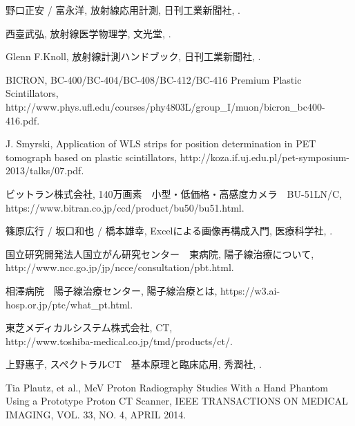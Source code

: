 \begin{bib}[100]
     野口正安 / 富永洋,
     \newblock 放射線応用計測,
     \newblock 日刊工業新聞社,
     .
     
     西臺武弘,
     \newblock 放射線医学物理学,
     \newblock 文光堂,
     .
     
     Glenn F.Knoll,
     \newblock 放射線計測ハンドブック,
     \newblock 日刊工業新聞社,
     .
     
     BICRON,
     \newblock BC-400/BC-404/BC-408/BC-412/BC-416 Premium Plastic Scintillators,
     \newblock http://www.phys.ufl.edu/courses/phy4803L/group\_I/muon/bicron\_bc400-416.pdf.
     
     J. Smyrski,
     \newblock Application of WLS strips for position determination in PET tomograph based on plastic scintillators,
     \newblock http://koza.if.uj.edu.pl/pet-symposium-2013/talks/07.pdf.

     ビットラン株式会社,
     \newblock 140万画素　小型・低価格・高感度カメラ　BU-51LN/C,
     \newblock https://www.bitran.co.jp/ccd/product/bu50/bu51.html.
     
     篠原広行 / 坂口和也 / 橋本雄幸,
     \newblock Excelによる画像再構成入門,
     \newblock 医療科学社,
     .
     
     国立研究開発法人国立がん研究センター　東病院,
     \newblock 陽子線治療について,
     \newblock http://www.ncc.go.jp/jp/ncce/consultation/pbt.html.
     
     相澤病院　陽子線治療センター,
     \newblock 陽子線治療とは,
     \newblock https://w3.ai-hosp.or.jp/ptc/what\_pt.html.
     
     東芝メディカルシステム株式会社,
     \newblock CT,\\
     \newblock http://www.toshiba-medical.co.jp/tmd/products/ct/.
     
     上野惠子,
     \newblock スペクトラルCT　基本原理と臨床応用,
     \newblock 秀潤社,
     .
     
          Tia Plautz, et al.,
      MeV Proton Radiography Studies With a Hand Phantom Using a Prototype Proton CT Scanner,
     \newblock IEEE TRANSACTIONS ON MEDICAL IMAGING, VOL. 33, NO. 4, APRIL 2014.
     

\end{bib}
